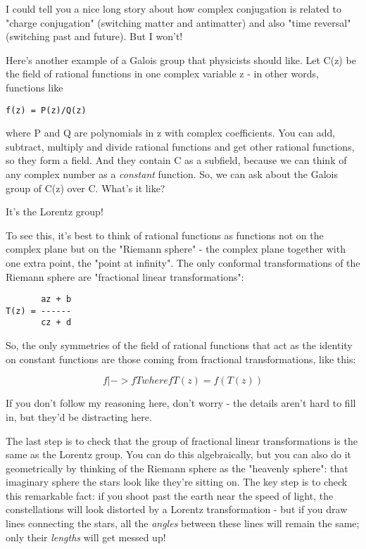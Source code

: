 I could tell you a nice long story about how complex conjugation is
related to "charge conjugation" (switching matter and antimatter) and 
also "time reversal" (switching past and future).  But I won't!

Here's another example of a Galois group that physicists should like.  
Let C(z) be the field of rational functions in one complex variable z -
in other words, functions like

\begin{verbatim}
f(z) = P(z)/Q(z)
\end{verbatim}
    
where P and Q are polynomials in z with complex coefficients.  You can 
add, subtract, multiply and divide rational functions and get other 
rational functions, so they form a field.  And they contain C as a 
subfield, because we can think of any complex number as a \emph{constant}
function.  So, we can ask about the Galois group of C(z) over C.
What's it like?

It's the Lorentz group!

To see this, it's best to think of rational functions as functions not
on the complex plane but on the "Riemann sphere" - the complex plane 
together with one extra point, the "point at infinity".  The only 
conformal transformations of the Riemann sphere are "fractional linear
transformations":

\begin{verbatim}
       az + b
T(z) = ------
       cz + d
\end{verbatim}
    
So, the only symmetries of the field of rational functions that 
act as the identity on constant functions are those coming from 
fractional transformations, like this:

$$
f |-> fT                        where fT(z) = f(T(z)) 
$$
    
If you don't follow my reasoning here, don't worry - the details aren't 
hard to fill in, but they'd be distracting here.  

The last step is to check that the group of fractional linear 
transformations is the same as the Lorentz group.  You can do this 
algebraically, but you can also do it geometrically by thinking of the 
Riemann sphere as the "heavenly sphere": that imaginary sphere the stars 
look like they're sitting on.  The key step is to check this remarkable fact: 
if you shoot past the earth near the speed of light, the constellations will
look distorted by a Lorentz transformation - but if you draw lines connecting
the stars, all the \emph{angles} between these lines 
will remain the same; only 
their \emph{lengths} will get messed up!  

